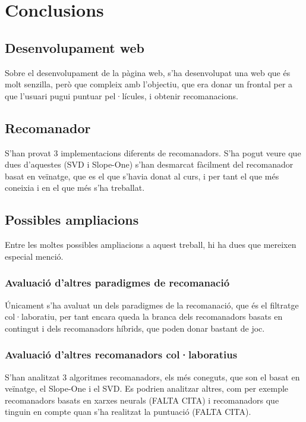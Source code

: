 \chapter{Conclusions}

\section{Desenvolupament web}

Sobre el desenvolupament de la pàgina web, s'ha desenvolupat una web que és molt senzilla, però que compleix amb l'objectiu, que era donar un frontal per a que l'usuari pugui puntuar pel·lícules, i obtenir recomanacions.

\section{Recomanador}

S'han provat 3 implementacions diferents de recomanadors. S'ha pogut veure que dues d'aquestes (SVD i Slope-One) s'han desmarcat fàcilment del recomanador basat en veïnatge, que es el que s'havia donat al curs, i per tant el que més coneixia i en el que més s'ha treballat.

\section{Possibles ampliacions}

Entre les moltes possibles ampliacions a aquest treball, hi ha dues que mereixen especial menció.

\subsection{Avaluació d'altres paradigmes de recomanació}

Únicament s'ha avaluat un dels paradigmes de la recomanació, que és el filtratge col·laboratiu, per tant encara queda la branca dels recomanadors basats en contingut i dels recomanadors híbrids, que poden donar bastant de joc.

\subsection{Avaluació d'altres recomanadors col·laboratius}

S'han analitzat 3 algoritmes recomanadors, els més coneguts, que son el basat en veïnatge, el Slope-One i el SVD. Es podrien analitzar altres, com per exemple recomanadors basats en xarxes neurals (FALTA CITA) i recomanadors que tinguin en compte quan s'ha realitzat la puntuació (FALTA CITA).